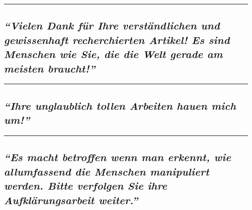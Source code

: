 \begin{center}\rule{0.5\linewidth}{\linethickness}\end{center}

\hypertarget{vielen-dank-fuxfcr-ihre-verstuxe4ndlichen-und-gewissenhaft-recherchierten-artikel-es-sind-menschen-wie-sie-die-die-welt-gerade-am-meisten-braucht}{%
\subsection{\texorpdfstring{\emph{``Vielen Dank für Ihre verständlichen
und gewissenhaft recherchierten Artikel! Es sind Menschen wie Sie, die
die Welt gerade am meisten
braucht!''}}{``Vielen Dank für Ihre verständlichen und gewissenhaft recherchierten Artikel! Es sind Menschen wie Sie, die die Welt gerade am meisten braucht!''}}\label{vielen-dank-fuxfcr-ihre-verstuxe4ndlichen-und-gewissenhaft-recherchierten-artikel-es-sind-menschen-wie-sie-die-die-welt-gerade-am-meisten-braucht}}

\begin{center}\rule{0.5\linewidth}{\linethickness}\end{center}

\hypertarget{ihre-unglaublich-tollen-arbeiten-hauen-mich-um}{%
\subsection{\texorpdfstring{\emph{``Ihre unglaublich tollen Arbeiten
hauen mich
um!''}}{``Ihre unglaublich tollen Arbeiten hauen mich um!''}}\label{ihre-unglaublich-tollen-arbeiten-hauen-mich-um}}

\begin{center}\rule{0.5\linewidth}{\linethickness}\end{center}

\hypertarget{es-macht-betroffen-wenn-man-erkennt-wie-allumfassend-die-menschen-manipuliert-werden-bitte-verfolgen-sie-ihre-aufkluxe4rungsarbeit-weiter}{%
\subsection{\texorpdfstring{\emph{``Es macht betroffen wenn man erkennt,
wie allumfassend die Menschen manipuliert werden. Bitte verfolgen Sie
ihre Aufklärungsarbeit
weiter.''}}{``Es macht betroffen wenn man erkennt, wie allumfassend die Menschen manipuliert werden. Bitte verfolgen Sie ihre Aufklärungsarbeit weiter.''}}\label{es-macht-betroffen-wenn-man-erkennt-wie-allumfassend-die-menschen-manipuliert-werden-bitte-verfolgen-sie-ihre-aufkluxe4rungsarbeit-weiter}}


